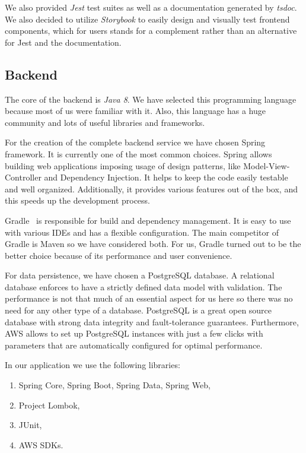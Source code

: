 \documentclass[licencjacka,en]{thesisclass}
\begin{document}
    We also provided \textit{Jest} test suites
    as well as a documentation generated by \textit{tsdoc}.
    We also decided to utilize \textit{Storybook}
    to easily design and visually test frontend components,
    which for users stands for a complement
    rather than an alternative for Jest and the documentation.

    \subsection{Backend}

    The core of the backend is \textit{Java 8}.
    We have selected this programming language because most of us were familiar with it.
    Also, this language has a huge community and lots of useful libraries and frameworks.

    For the creation of the complete backend service we have chosen Spring~\cite{Spring} framework.
    It is currently one of the most common choices.
    Spring allows building web applications imposing usage
    of design patterns, like Model-View-Controller and Dependency Injection.
    It helps to keep the code easily testable and well organized.
    Additionally, it provides various features out of the box,
    and this speeds up the development process.

    Gradle~\cite{Gradle} is responsible for build and dependency management.
    It is easy to use with various IDEs and has a flexible configuration.
    The main competitor of Gradle is Maven so we have considered both.
    For us, Gradle turned out to be the better choice because
    of its performance and user convenience.

    For data persistence, we have chosen a PostgreSQL database.
    A relational database enforces to have a strictly defined data model with validation.
    The performance is not that much of an essential aspect for us here
    so there was no need for any other type of a database.
    PostgreSQL is a great open source database with strong data integrity
    and fault-tolerance guarantees.
    Furthermore, AWS allows to set up PostgreSQL instances with just a few clicks
    with parameters that are automatically configured for optimal performance.

    In our application we use the following libraries:
    \begin{enumerate}
        \item Spring Core, Spring Boot, Spring Data, Spring Web,
        \item Project Lombok,
        \item JUnit,
        \item AWS SDKs.
    \end{enumerate}
\end{document}
